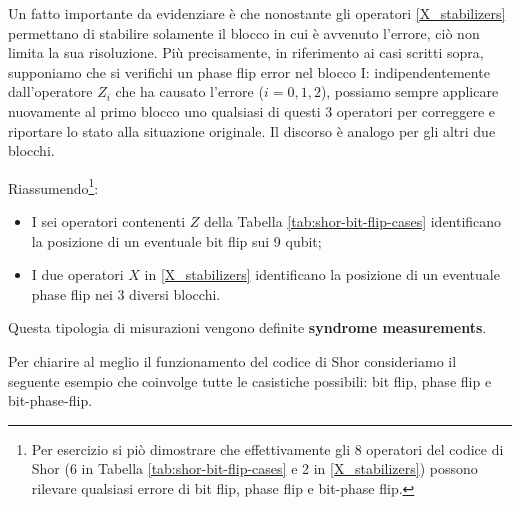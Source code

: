 \noindent Un fatto importante da evidenziare è che nonostante gli operatori \eqref{X_stabilizers} permettano di stabilire solamente il blocco in cui è avvenuto l'errore, ciò non limita la sua risoluzione. Più precisamente, in riferimento ai casi scritti sopra, supponiamo che si verifichi un phase flip error nel blocco I: indipendentemente dall'operatore $Z_i$ che ha causato l'errore ($i = 0, 1, 2$), possiamo sempre applicare nuovamente al primo blocco uno qualsiasi di questi 3 operatori per correggere e riportare lo stato alla situazione originale. Il discorso è analogo per gli altri due blocchi. 

\noindent Riassumendo\footnote{Per esercizio si piò dimostrare che effettivamente gli 8 operatori del codice di Shor (6 in Tabella \ref{tab:shor-bit-flip-cases} e 2 in \eqref{X_stabilizers}) possono rilevare qualsiasi errore di bit flip, phase flip e bit-phase flip.}:
\begin{itemize}
    \item I sei operatori contenenti $Z$ della Tabella \ref{tab:shor-bit-flip-cases} identificano la posizione di un eventuale bit flip sui 9 qubit;
    \item I due operatori $X$ in \eqref{X_stabilizers} identificano la posizione di un eventuale phase flip nei 3 diversi blocchi.
\end{itemize}
Questa tipologia di misurazioni vengono definite \textbf{syndrome measurements}.

\noindent Per chiarire al meglio il funzionamento del codice di Shor consideriamo il seguente esempio che coinvolge tutte le casistiche possibili: bit flip, phase flip e bit-phase-flip.

